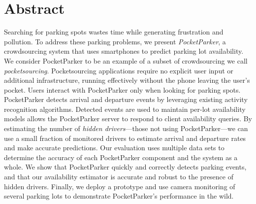 \section*{Abstract}

Searching for parking spots wastes time while generating frustration and
pollution. To address these parking problems, we present
\textit{PocketParker}, a crowdsourcing system that uses smartphones to
predict parking lot availability. We consider PocketParker to be an example
of a subset of crowdsourcing we call \textit{pocketsourcing}. Pocketsourcing
applications require no explicit user input or additional infrastructure,
running effectively without the phone leaving the user's pocket. Users
interact with PocketParker only when looking for parking spots. PocketParker
detects arrival and departure events by leveraging existing activity
recognition algorithms. Detected events are used to maintain per-lot
availability models allows the PocketParker server to respond to client
availability queries. By estimating the number of \textit{hidden
drivers}---those not using PocketParker---we can use a small fraction of
monitored drivers to estimate arrival and departure rates and make accurate
predictions. Our evaluation uses multiple data sets to determine the accuracy
of each PocketParker component and the system as a whole. We show that
PocketParker quickly and correctly detects parking events, and that our
availability estimator is accurate and robust to the presence of hidden
drivers. Finally, we deploy a prototype and use camera monitoring of several
parking lots to demonstrate PocketParker's performance in the wild.
